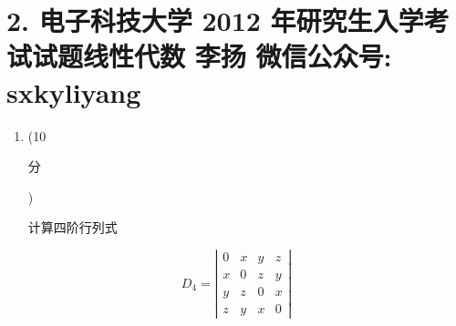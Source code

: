 \documentclass[10pt]{article}
\begin{document}
\section{2. 电子科技大学 2012 年研究生入学考试试题线性代数 
 李扬 
 微信公众号: sxkyliyang}
\begin{enumerate}
  \item (10 \begin{CJK}{UTF8}{mj}分\end{CJK}) \begin{CJK}{UTF8}{mj}计算四阶行列式\end{CJK}
\end{enumerate}
$$
D_{4}=\left|\begin{array}{llll}
0 & x & y & z \\
x & 0 & z & y \\
y & z & 0 & x \\
z & y & x & 0
\end{array}\right|
$$
\end{document}
